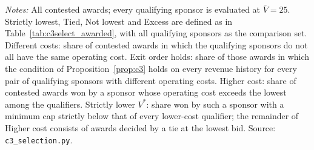 \begin{table}[htbp]\centering\small
\caption{Selection evaluated at the common cap $\bar V$ in contested awards (costless exit)}\label{tab:c3select_common}
\par\smallskip\begin{minipage}{\textwidth}\footnotesize\textit{Notes:} All contested awards; every qualifying sponsor is evaluated at $\bar V = 25$. Strictly lowest, Tied, Not lowest and Excess are defined as in Table~\ref{tab:c3select_awarded}, with all qualifying sponsors as the comparison set. Different costs: share of contested awards in which the qualifying sponsors do not all have the same operating cost. Exit order holds: share of those awards in which the condition of Proposition~\ref{prop:c3} holds on every revenue history for every pair of qualifying sponsors with different operating costs. Higher cost: share of contested awards won by a sponsor whose operating cost exceeds the lowest among the qualifiers. Strictly lower $V^*$: share won by such a sponsor with a minimum cap strictly below that of every lower-cost qualifier; the remainder of Higher cost consists of awards decided by a tie at the lowest bid. Source: \texttt{c3\_selection.py}.\end{minipage}
\end{table}

